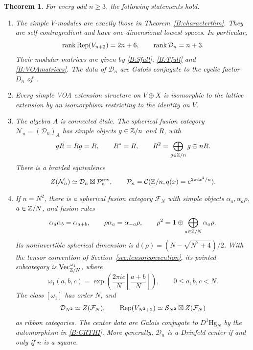 \documentclass[11pt]{article}
\newtheorem{theorem}{Theorem}[section]
\newcommand{\one}{\mathbf1}\newcommand{\D}{\mathcal D}\newcommand{\Dcat}{\mathcal D}
\newcommand{\Ncat}{\mathcal N}\newcommand{\Pcat}{\mathcal P}\newcommand{\Fcat}{\mathcal F}
\newcommand{\Scat}{\mathcal S}\newcommand{\U}{\mathcal U}\newcommand{\bo}{\boxtimes}
\newcommand{\rank}{\operatorname{rank}}\newcommand{\End}{\operatorname{End}}
\numberwithin{equation}{section}
\begin{document}
\begin{theorem}\label{A:cat:main}
For every odd $n\geq3$, the following statements hold.
\begin{enumerate}[label=(\roman*),leftmargin=8mm]
\item The simple $V$-modules are exactly those in Theorem~\ref{B:characterthm}. They are self-contragredient and have one-dimensional lowest spaces. In particular,
\[
 \rank\Rep(V_{n+2})=2n+6,\qquad \rank\D_n=n+3.
\]
Their modular matrices are given by \eqref{B:Sfull}, \eqref{B:Tfull} and \eqref{B:VOAmatrices}. The data of $\D_n$ are Galois conjugate to the cyclic factor $D_n$ of~\cite{A:EG}.
\item Every simple VOA extension structure on $V\oplus X$ is isomorphic to the lattice extension by an isomorphism restricting to the identity on $V$.
\item The algebra $A$ is connected \'etale. The spherical fusion category $\Ncat_n=(\D_n)_A$ has simple objects $g\in\mathbb Z/n$ and $R$, with
\begin{equation}\label{A:cat:NG}
 gR=Rg=R,\qquad R^*=R,\qquad
 R^2=\bigoplus_{g\in\mathbb Z/n}g\oplus nR.
\end{equation}
There is a braided equivalence
\begin{equation}\label{A:cat:NGcenter}
 Z(\Ncat_n)\simeq\D_n\bo\Pcat_n^{\rm rev},\qquad
 \Pcat_n=\mathcal C(\Z/n,q(x)=e^{2\pi ix^2/n}).
\end{equation}
\item If $n=N^2$, there is a spherical fusion category $\Fcat_N$ with simple objects $\alpha_a,\alpha_a\rho$, $a\in\mathbb Z/N$, and fusion rules
\begin{equation}\label{A:cat:HI}
 \alpha_a\alpha_b=\alpha_{a+b},\qquad
 \rho\alpha_a=\alpha_{-a}\rho,\qquad
 \rho^2=\one\oplus\bigoplus_{a\in\Z/N}\alpha_a\rho.
\end{equation}
Its noninvertible spherical dimension is $d(\rho)=(N-\sqrt{N^2+4})/2$. With the tensor convention of Section~\ref{sec:tensorconvention}, its pointed subcategory is $\mathrm{Vec}_{\mathbb Z/N}^{\omega_1}$, where
\begin{equation}\label{A:cat:omega}
 \omega_1(a,b,c)=\exp\!\left(\frac{2\pi ic}{N}
                       \left\lfloor\frac{a+b}{N}\right\rfloor\right),
 \qquad 0\leq a,b,c<N.
\end{equation}
The class $[\omega_1]$ has order $N$, and
\begin{equation}\label{A:cat:realization}
 \D_{N^2}\simeq Z(\Fcat_N),\qquad
 \Rep(V_{N^2+2})\simeq\Scat_{N^2}\bo Z(\Fcat_N)
\end{equation}
as ribbon categories. The center data are Galois conjugate to $D^1\mathrm{Hg}_N$ by the automorphism in \eqref{B:CRTHI}. More generally, $\D_n$ is a Drinfeld center if and only if $n$ is a square.
\end{enumerate}
\end{theorem}
\end{document}
